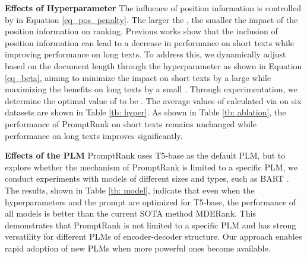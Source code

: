 \documentclass[11pt]{article}
\begin{document}
\begin{table}[ht]
\centering
{}
\caption{Information of hyperparameter setting.  means the dataset is not sensitive to .  represents the average values of  calculated by  on various datasets and the last three datasets have the same value because of truncation. }
\label{tb: hyper}
\end{table}



\noindent
{\bf Effects of Hyperparameter } The influence of position information is controlled by  in Equation \ref{eq_pos_penalty}. The larger the , the smaller the impact of the position information on ranking. Previous works \cite{bennani-smires-etal-2018-simple, 8954611} show that the inclusion of position information can lead to a decrease in performance on short texts while improving performance on long texts. To address this, we dynamically adjust  based on the document length through the hyperparameter  as shown in Equation \ref{eq_beta}, aiming to minimize the impact on short texts by a large  while maximizing the benefits on long texts by a small . Through experimentation, we determine the optimal value of  to be . The average values of  calculated via  on six datasets are shown in Table \ref{tb: hyper}. As shown in Table \ref{tb: ablation}, the performance of PromptRank on short texts remains unchanged while performance on long texts improves significantly.




\noindent
{\bf Effects of the PLM} 
PromptRank uses T5-base as the default PLM, but to explore whether the mechanism of PromptRank is limited to a specific PLM, we conduct experiments with models of different sizes and types, such as BART \cite{lewis-etal-2020-bart}. The results, shown in Table \ref{tb: model}, indicate that even when the hyperparameters and the prompt are optimized for T5-base, the performance of all models is better than the current SOTA method MDERank. This demonstrates that PromptRank is not limited to a specific PLM and has strong versatility for different PLMs of encoder-decoder structure. Our approach enables rapid adoption of new PLMs when more powerful ones become available.
\end{document}
